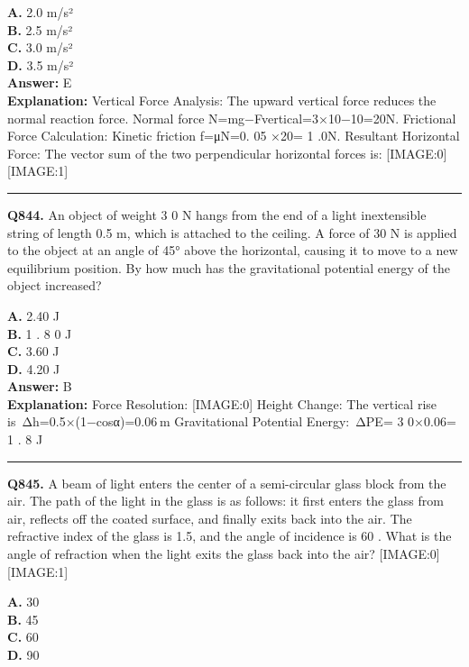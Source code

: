 \documentclass[12pt]{article}
\begin{document}
\textbf{A.} 2.0 m/s² \\
\textbf{B.} 2.5 m/s² \\
\textbf{C.} 3.0 m/s² \\
\textbf{D.} 3.5 m/s² \\

\textbf{Answer:} E \\
\textbf{Explanation:} Vertical Force Analysis:
The upward vertical force reduces the normal reaction force.
Normal force N=mg−Fvertical​=3×10−10=20N.
Frictional Force Calculation:
Kinetic friction f=μN=0.
05
×20=
1
.0N.
Resultant Horizontal Force:
The vector sum of the two perpendicular horizontal forces is:
[IMAGE:0]
[IMAGE:1]

\hrule
\vspace{1em}


\noindent
\textbf{Q844.} An object of weight
3
0 N hangs from the end of a light inextensible string of length 0.5 m, which is attached to the ceiling. A force of 30 N is applied to the object at an angle of 45° above the horizontal, causing it to move to a new equilibrium position. By how much has the gravitational potential energy of the object increased?



\textbf{A.} 2.40 J \\
\textbf{B.} 1
.
8
0 J \\
\textbf{C.} 3.60 J \\
\textbf{D.} 4.20 J \\

\textbf{Answer:} B \\
\textbf{Explanation:} Force Resolution:
[IMAGE:0]
Height Change: The vertical rise is Δh=0.5×(1−cosα)=0.06 m
Gravitational Potential Energy: ΔPE=
3
0×0.06=
1
.
8
J

\hrule
\vspace{1em}


\noindent
\textbf{Q845.} A beam of light enters the center of a semi-circular glass block from the air.
The path of the light in the glass is as follows: it first enters the glass from air, reflects off the coated surface, and finally exits back into the air. The refractive index of the glass is 1.5, and the angle of incidence is
60
\circ 
. What is the angle of refraction when the light exits the glass back into the air?
[IMAGE:0]
[IMAGE:1]



\textbf{A.} 30
\circ  \\
\textbf{B.} 45
\circ  \\
\textbf{C.} 60
\circ  \\
\textbf{D.} 90
\circ  \\
\end{document}
